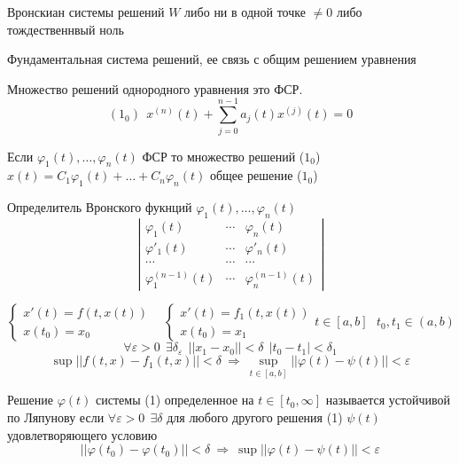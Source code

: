 \begin{block}[Следствие]
  Вронскиан системы решений $W$ либо ни в одной точке $\not= 0$ либо
  тождественнвый ноль
\end{block}

\begin{title}[\Large]
  Фундаментальная система решений, ее связь с общим решением уравнения
\end{title}

\begin{theorem}
  Множество решений однородного уравнения
  это ФСР.
  $$
  (1_0) ~~ x^{(n)}(t) + \sum_{j=0}^{n-1} a_j(t)x^{(j)}(t) = 0
  $$

  Если $\varphi_1(t), \ldots, \varphi_n(t)$ ФСР то множество решений ($1_0$)
  $x(t) = C_1 \varphi_1(t) + \ldots + C_n \varphi_n(t)$ общее решение ($1_0$)
\end{theorem}

\begin{define}
  Определитель Вронского фукнций $\varphi_1(t), \ldots, \varphi_n(t)$
  $$
  \left|
  \begin{array}{ccc}
    \varphi_1(t) & \cdots & \varphi_n(t) \\
    \varphi'_1(t) & \cdots & \varphi'_n(t) \\
    \cdots &
    \cdots &
    \cdots \\
    \varphi_1^{(n-1)}(t) & \cdots & \varphi_n^{(n-1)}(t)
  \end{array}
  \right|
  $$
\end{define}

\begin{define}
  $$
  \left\{
  \begin{array}{l}
    x'(t) = f(t, x(t)) \\
    x(t_0) = x_0
  \end{array}
  \right.
  ~~~~
  \left\{
  \begin{array}{l}
    x'(t) = f_1(t, x(t)) \\
    x(t_0) = x_1
  \end{array}
  \right.
  t \in [a,b] ~~~ t_0, t_1 \in (a,b)
  $$
  $$
  \forall \varepsilon > 0 ~~ \exists \delta_{\varepsilon} ~~ ||x_1 - x_0||
  < \delta ~~ |t_0 - t_1| < \delta_1
  $$
  $$
  \sup ||f(t,x) - f_1(t,x)|| < \delta
  ~ \Rightarrow ~ \sup_{t \in [a,b]} ||\varphi(t) - \psi(t)|| < \varepsilon
  $$
\end{define}

\begin{define}
  Решение $\varphi(t)$ системы (1) определенное на $t \in [t_0, \infty]$
  называется устойчивой по Ляпунову если $\forall \varepsilon > 0 ~~ \exists
  \delta$ для любого другого решения (1) $\psi(t)$ удовлетворяющего условию
  $$
  ||\varphi(t_0) - \varphi(t_0)|| < \delta ~ \Rightarrow ~ \sup||\varphi(t) -
  \psi(t)|| < \varepsilon
  $$
\end{define}

